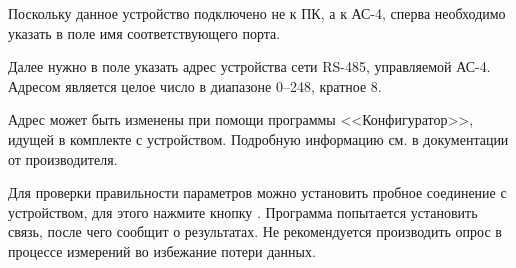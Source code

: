 Поскольку данное устройство подключено не к ПК, а к АС-4, сперва необходимо указать в поле  имя соответствующего порта.

Далее нужно в поле  указать адрес устройства сети RS-485, управляемой АС-4. Адресом является целое число в диапазоне 0--248, кратное 8.

Адрес может быть изменены при помощи программы <<Конфигуратор>>, идущей в комплекте с устройством. Подробную информацию см. в документации от производителя.


Для проверки правильности параметров можно установить пробное соединение с устройством, для этого нажмите кнопку . Программа попытается установить связь, после чего сообщит о результатах. Не рекомендуется производить опрос в процессе измерений во избежание потери данных.
